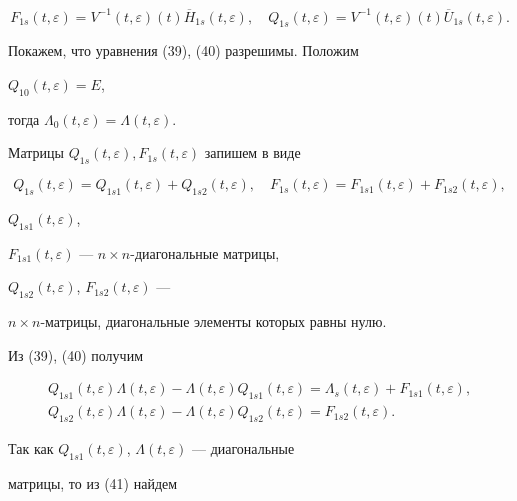 \begin{pf}
$$


F_{1s}(t,\varepsilon)=V^{-1}(t,\varepsilon)(t)\overline{H}_{1s}


(t,\varepsilon),\quad Q_{1s}(t,\varepsilon)


=V^{-1}(t,\varepsilon)(t)\overline{U}_{1s}(t,\varepsilon).


$$





Покажем, что уравнения (39), (40) разрешимы. Положим


$Q_{10}(t,\varepsilon)=E$,


тогда $\Lambda_{0}(t,\varepsilon)=\Lambda(t,\varepsilon)$.


Матрицы $Q_{1s}(t,\varepsilon),F_{1s}(t,\varepsilon)$ запишем в виде


$$


Q_{1s}(t,\varepsilon)=Q_{1s1}(t,\varepsilon)+Q_{1s2}(t,\varepsilon),\quad


F_{1s}(t,\varepsilon)=F_{1s1}(t,\varepsilon)+F_{1s2}(t,\varepsilon),


$$


$Q_{1s1}(t,\varepsilon)$,


$F_{1s1}(t,\varepsilon)$ --- $n \times n$-диагональные матрицы,


$Q_{1s2}(t,\varepsilon)$, $F_{1s2}(t,\varepsilon)$ ---


$n \times n$-матрицы, диагональные элементы которых равны нулю.


Из (39), (40) получим


\begin{gather}


Q_{1s1}(t,\varepsilon)\Lambda(t,\varepsilon)-\Lambda(t,\varepsilon)


Q_{1s1} (t,\varepsilon) =\Lambda_{s}(t,\varepsilon)+


F_{1s1}(t,\varepsilon), \\


%


Q_{1s2}(t,\varepsilon)\Lambda(t,\varepsilon)-\Lambda(t,\varepsilon)


Q_{1s2} (t,\varepsilon) = F_{1s2}(t,\varepsilon).


\end{gather}





Так как $Q_{1s1}(t,\varepsilon)$, $\Lambda(t,\varepsilon)$ --- диагональные


матрицы, то из (41) найдем



\end{pf}
